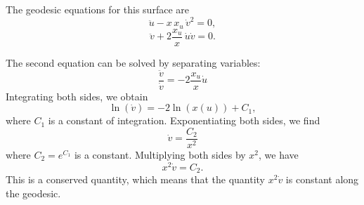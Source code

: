 \documentclass[12pt]{article}
\begin{document}
The geodesic equations for this surface are
\begin{equation}
    \ddot{u} - x\,x_{u}\,\dot{v}^2 = 0,
\end{equation}
\begin{equation}
    \ddot{v} + 2\frac{x_{u}}{x}\,\dot{u}\dot{v} = 0.
\end{equation}

The second equation can be solved by separating variables:
\[
    \frac{\ddot{v}}{\dot{v}} = -2\frac{x_{u}}{x}\dot{u}
\]
Integrating both sides, we obtain
\[
    \ln(\dot{v}) = -2 \ln(x(u)) + C_1,
\]
where \(C_1\) is a constant of integration.
Exponentiating both sides, we find
\[
    \dot{v} = \frac{C_2}{x^2}
\]
where \(C_2 = e^{C_1}\) is a constant.
Multiplying both sides by \(x^2\), we have
\[
    x^2 \dot{v} = C_2.
\]
This is a conserved quantity, which means that the quantity \(x^2 \dot{v}\) is constant along the geodesic.
\end{document}

